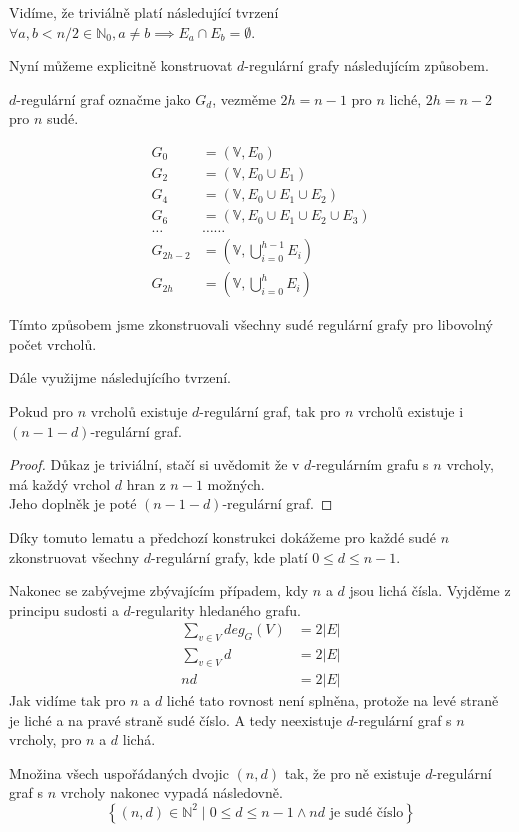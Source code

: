 \documentclass[../main.tex]{subfiles}
\begin{document}
Vidíme, že triviálně platí následující tvrzení $\forall a,b <n/2 \in \mathbb{N}_0, a\neq b \implies E_a \cap E_b = \emptyset$.



Nyní můžeme explicitně konstruovat $d$-regulární grafy následujícím způsobem. 

$d$-regulární graf označme jako $G_d$, vezměme $2h=n-1$ pro $n$ liché, $2h=n-2$ pro $n$ sudé. 

\begin{align*}
    G_0 &= (\mathbb{V}, E_0 )\\
    G_2 &= (\mathbb{V}, E_0 \cup E_1)\\
    G_4 &= (\mathbb{V}, E_0 \cup E_1 \cup E_2)\\
    G_6 &= (\mathbb{V}, E_0 \cup E_1 \cup E_2 \cup E_3)\\
    \dots&\dots\dots\\
    G_{2h-2} &= (\mathbb{V}, \bigcup_{i=0}^{h-1} E_i)\\
    G_{2h} &= (\mathbb{V}, \bigcup_{i=0}^{h} E_i)
\end{align*}


Tímto způsobem jsme zkonstruovali všechny sudé regulární grafy pro libovolný počet vrcholů.


Dále využijme následujícího tvrzení.
\begin{lemma*}
    Pokud pro $n$ vrcholů existuje $d$-regulární graf, tak pro $n$ vrcholů existuje i $(n-1-d)$-regulární graf.    
\end{lemma*}
\begin{proof}
    Důkaz je triviální, stačí si uvědomit že v $d$-regulárním grafu s $n$ vrcholy, má každý vrchol $d$ hran z $n-1$ možných. \\
    Jeho doplněk je poté $(n-1-d)$-regulární graf. 
\end{proof}

Díky tomuto lematu a předchozí konstrukci dokážeme pro každé sudé $n$ zkonstruovat všechny $d$-regulární grafy, kde platí $0\leq d\leq n-1$. 

Nakonec se zabývejme zbývajícím případem, kdy $n$ a $d$ jsou lichá čísla. Vyjděme z principu sudosti a $d$-regularity hledaného grafu.
\begin{align*}
    \sum_{v\in V} deg_{G}(V) &= 2|E|\\
    \sum_{v\in V} d &= 2|E|\\
    n d &= 2|E|
\end{align*}
Jak vidíme tak pro $n$ a $d$ liché tato rovnost není splněna, protože na levé straně je liché a na pravé straně sudé číslo.
A tedy neexistuje $d$-regulární graf s $n$ vrcholy, pro $n$ a $d$ lichá.

Množina všech uspořádaných dvojic $(n,d)$ tak, že pro ně existuje $d$-regulární graf s $n$ vrcholy nakonec vypadá následovně.
\begin{equation*}
    \left\{  (n,d)\in\mathbb{N}^2 \mid  0\leq d\leq n-1 \wedge nd \text{ je sudé číslo} \right\}
\end{equation*}
\end{document}
